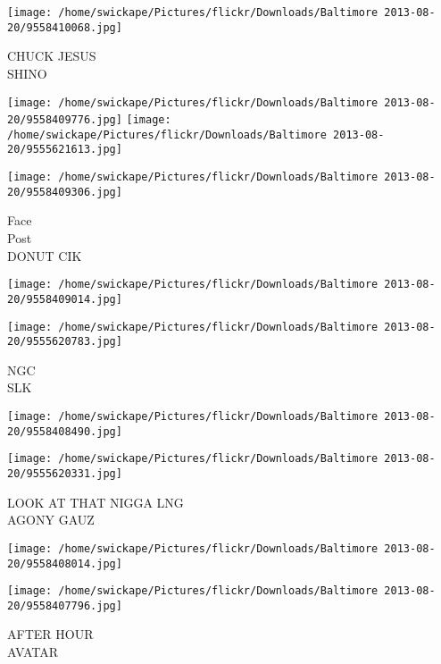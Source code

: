 \documentclass[10pt,letterpaper]{article}
\begin{document}
\vspace{0.25in}
\texttt{[image: /home/swickape/Pictures/flickr/Downloads/Baltimore 2013-08-20/9558410068.jpg]}

CHUCK JESUS\\
SHINO\\
\pagebreak

\texttt{[image: /home/swickape/Pictures/flickr/Downloads/Baltimore 2013-08-20/9558409776.jpg]}
\texttt{[image: /home/swickape/Pictures/flickr/Downloads/Baltimore 2013-08-20/9555621613.jpg]}

\vspace{0.25in}
\texttt{[image: /home/swickape/Pictures/flickr/Downloads/Baltimore 2013-08-20/9558409306.jpg]}

Face\\
Post\\
DONUT CIK\\
\pagebreak

\texttt{[image: /home/swickape/Pictures/flickr/Downloads/Baltimore 2013-08-20/9558409014.jpg]}

\vspace{0.25in}
\texttt{[image: /home/swickape/Pictures/flickr/Downloads/Baltimore 2013-08-20/9555620783.jpg]}

NGC\\
SLK\\
\pagebreak

\texttt{[image: /home/swickape/Pictures/flickr/Downloads/Baltimore 2013-08-20/9558408490.jpg]}

\vspace{0.25in}
\texttt{[image: /home/swickape/Pictures/flickr/Downloads/Baltimore 2013-08-20/9555620331.jpg]}

LOOK AT THAT NIGGA LNG\\
AGONY GAUZ\\
\pagebreak

\texttt{[image: /home/swickape/Pictures/flickr/Downloads/Baltimore 2013-08-20/9558408014.jpg]}

\vspace{0.25in}
\texttt{[image: /home/swickape/Pictures/flickr/Downloads/Baltimore 2013-08-20/9558407796.jpg]}

AFTER HOUR\\
AVATAR\\
\pagebreak
\end{document}
